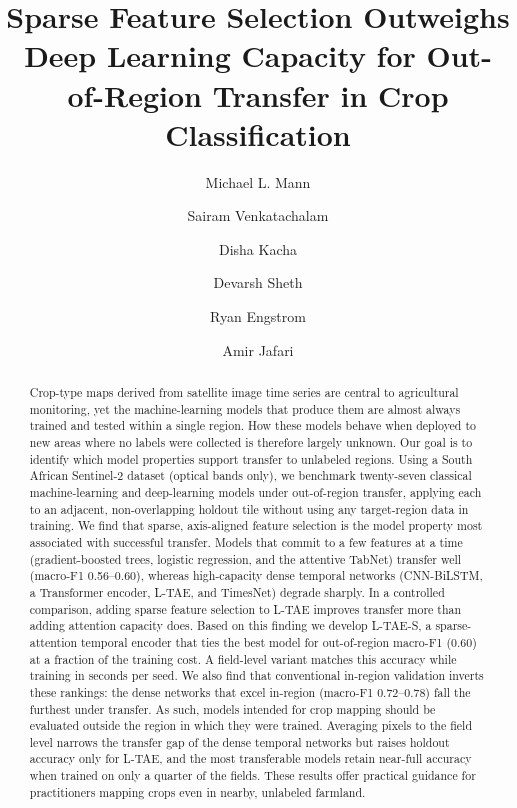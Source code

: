 \documentclass[preprint,authoryear]{elsarticle}
\begin{document}
\begin{frontmatter}

\title{Sparse Feature Selection Outweighs Deep Learning Capacity for Out-of-Region Transfer in Crop Classification}

\author[gwgeo]{Michael L. Mann}
\author[gwds]{Sairam Venkatachalam}
\author[gwds]{Disha Kacha}
\author[gwds]{Devarsh Sheth}
\author[gwgeo]{Ryan Engstrom}
\author[gwds]{Amir Jafari}



\begin{abstract}
Crop-type maps derived from satellite image time series are central to agricultural monitoring, yet the machine-learning models that produce them are almost always trained and tested within a single region. How these models behave when deployed to new areas where no labels were collected is therefore largely unknown. Our goal is to identify which model properties support transfer to unlabeled regions. Using a South African Sentinel-2 dataset (optical bands only), we benchmark twenty-seven classical machine-learning and deep-learning models under out-of-region transfer, applying each to an adjacent, non-overlapping holdout tile without using any target-region data in training. We find that sparse, axis-aligned feature selection is the model property most associated with successful transfer. Models that commit to a few features at a time (gradient-boosted trees, logistic regression, and the attentive TabNet) transfer well (macro-F1 0.56--0.60), whereas high-capacity dense temporal networks (CNN-BiLSTM, a Transformer encoder, L-TAE, and TimesNet) degrade sharply. In a controlled comparison, adding sparse feature selection to L-TAE improves transfer more than adding attention capacity does. Based on this finding we develop L-TAE-S, a sparse-attention temporal encoder that ties the best model for out-of-region macro-F1 (0.60) at a fraction of the training cost. A field-level variant matches this accuracy while training in seconds per seed. We also find that conventional in-region validation inverts these rankings: the dense networks that excel in-region (macro-F1 0.72--0.78) fall the furthest under transfer. As such, models intended for crop mapping should be evaluated outside the region in which they were trained. Averaging pixels to the field level narrows the transfer gap of the dense temporal networks but raises holdout accuracy only for L-TAE, and the most transferable models retain near-full accuracy when trained on only a quarter of the fields. These results offer practical guidance for practitioners mapping crops even in nearby, unlabeled farmland.
\end{abstract}



\end{frontmatter}
\end{document}
